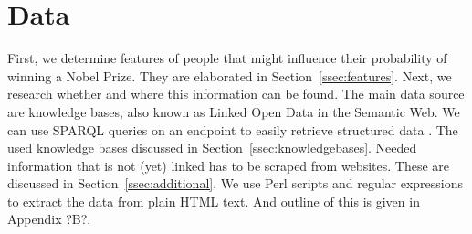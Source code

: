 \section{Data}
\label{sec:data}

First, we determine features of people that might influence their probability of winning a Nobel Prize. They are elaborated in Section~\ref{ssec:features}. Next, we research whether and where this information can be found. The main data source are knowledge bases, also known as Linked Open Data in the Semantic Web. We can use SPARQL queries on an endpoint to easily retrieve structured data \cite{wc3SPARQL}. The used knowledge bases discussed in Section~\ref{ssec:knowledgebases}. Needed information that is not (yet) linked has to be scraped from websites. These are discussed in Section~\ref{ssec:additional}. We use Perl scripts and regular expressions to extract the data from plain HTML text. And outline of this is given in Appendix ?B?.

